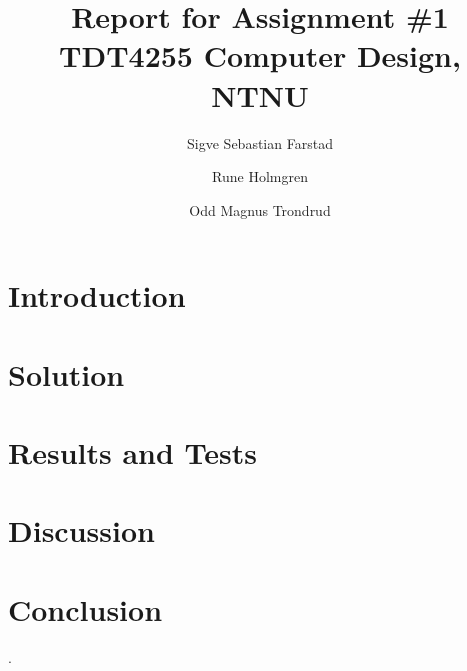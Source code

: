 \documentclass[10pt]{report}
\title{Report for Assignment \#1 \\
TDT4255 Computer Design, NTNU}
\author{Sigve Sebastian Farstad \and
		Rune Holmgren \and
		Odd Magnus Trondrud}
\begin{document}
\maketitle

\begin{abstract}
	
\end{abstract}

\tableofcontents

\chapter{Introduction}
	

\chapter{Solution}
	

\chapter{Results and Tests}
	

\chapter{Discussion}
	

\chapter{Conclusion}
	

\cite{compendium}.


{}

\nocite{*} %
\end{document}
